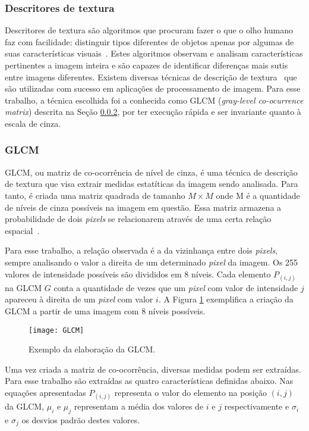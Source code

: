 \subsubsection{Descritores de textura}\label{sec:descritores}

Descritores de textura são algoritmos que procuram fazer o que o olho humano faz com facilidade: distinguir tipos diferentes de objetos apenas por algumas de suas características visuais~\cite{GLCM}. Estes algoritmos observam e analisam características pertinentes a imagem inteira e são capazes de identificar diferenças mais sutis entre imagens diferentes. Existem diversas técnicas de descrição de textura~\cite{ojala2002multiresolution} que são utilizadas com sucesso em aplicações de processamento de imagem. Para esse trabalho, a técnica escolhida foi a conhecida como GLCM (\textit{gray-level co-ocurrence matrix}) descrita na Seção \ref{sec:GLCM}, por ter execução rápida e ser invariante quanto à escala de cinza.

\subsubsection{GLCM}\label{sec:GLCM}

GLCM, ou matriz de co-ocorrência de nível de cinza, é uma técnica de descrição de textura que visa extrair medidas estatíticas da imagem sendo analisada. Para tanto, é criada uma matriz quadrada de tamanho $M\times M$ onde M é a quantidade de níveis de cinza possíveis na imagem em questão. Essa matriz armazena a probabilidade de dois \textit{pixels} se relacionarem através de uma certa relação espacial~\cite{GLCM}. 

Para esse trabalho, a relação observada é a da vizinhança entre dois \textit{pixels}, sempre analisando o valor a direita de um determinado \textit{pixel} da imagem. Os 255 valores de intensidade possíveis são divididos em 8 níveis. Cada elemento $P_{(i,j)}$ na GLCM $G$ conta a quantidade de vezes que um \textit{pixel} com valor de intensidade  $j$ apareceu à direita de um \textit{pixel} com valor $i$. A Figura \ref{fig:GLCM} exemplifica a criação da GLCM a partir de uma imagem com 8 níveis possíveis.

\begin{figure}
\texttt{[image: GLCM]} 
\centering
\caption[Exemplo da elaboração da GLCM]{Exemplo da elaboração da GLCM\protect\footnotemark.}
\label{fig:GLCM}
\centering
\end{figure}
Uma vez criada a matriz de co-ocorrência, diversas medidas podem ser extraídas. Para esse trabalho são extraídas as quatro características definidas abaixo. Nas equações apresentadas $P_{(i,j)}$ representa o valor do elemento na posição $(i,j)$ da GLCM, $\mu_i$ e $\mu_j$ representam a média dos valores de $i$ e $j$ respectivamente e $\sigma_i$ e $\sigma_j$ os desvios padrão destes valores.

